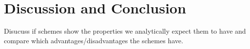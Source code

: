 \section{Discussion and Conclusion}
Disucuss if schemes show the properties we analytically expect them to have and compare which advantages/disadvantages the schemes have.
